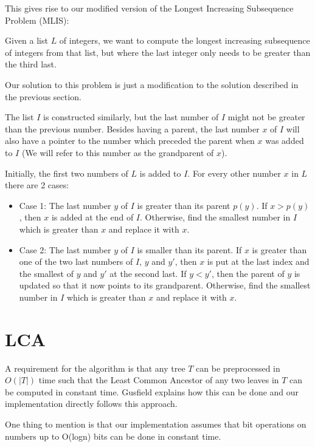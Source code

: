 This gives rise to our modified version of the Longest Increasing Subsequence Problem (MLIS):

Given a list $L$ of integers, we want to compute the longest increasing subsequence of integers from that list, but where the last integer only needs to be greater than the third last.

Our solution to this problem is just a modification to the solution described in the previous section.

The list $I$ is constructed similarly, but the last number of $I$ might not be greater than the previous number. Besides having a parent, the last number $x$ of $I$ will also have a pointer to the number which preceded the parent when $x$ was added to $I$ (We will refer to this number as the grandparent of $x$).

Initially, the first two numbers of $L$ is added to $I$. For every other number $x$ in $L$ there are 2 cases:

\begin{itemize}
	\item Case 1: The last number $y$ of $I$ is greater than its parent $p(y)$.
	\subitem If $x > p(y)$, then $x$ is added at the end of $I$.
	\subitem Otherwise, find the smallest number in $I$ which is greater than $x$ and replace it with $x$.
	\item Case 2: The last number $y$ of $I$ is smaller than its parent.
	\subitem If $x$ is greater than one of the two last numbers of $I$, $y$ and $y'$, then $x$ is put at the last index and the smallest of $y$ and $y'$ at the second last.
	\subsubitem If $y < y'$, then the parent of $y$ is updated so that it now points to its grandparent.
	\subitem Otherwise, find the smallest number in $I$ which is greater than $x$ and replace it with $x$.
\end{itemize}


\section{LCA}
A requirement for the algorithm is that any tree $T$ can be preprocessed in $O(|T|)$ time such that the Least Common Ancestor of any two leaves in $T$ can be computed in constant time. Gusfield  explains how this can be done and our implementation directly follows this approach.

One thing to mention is that our implementation assumes that bit operations on numbers up to O(logn) bits can be done in constant time. 


